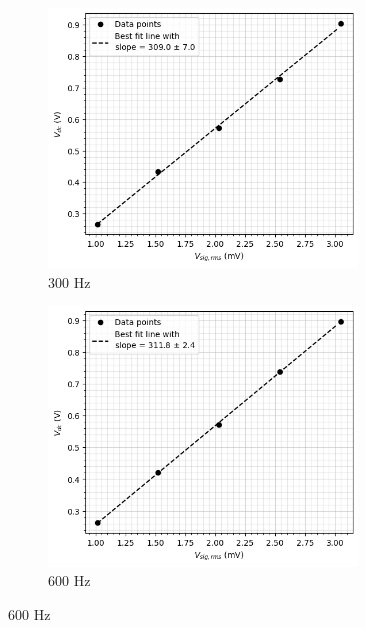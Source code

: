 \begin{figure}[H]
    \begin{subfigure}{\linewidth}
    \includegraphics[width=0.9\textwidth]{images/b1.png}
    \caption{300 Hz}
    \end{subfigure}
    
    \bigskip
    \begin{subfigure}{\linewidth}
    \includegraphics[width=0.9\textwidth]{images/b2.png}
    \caption{600 Hz}
    \end{subfigure}
    

\end{figure}
